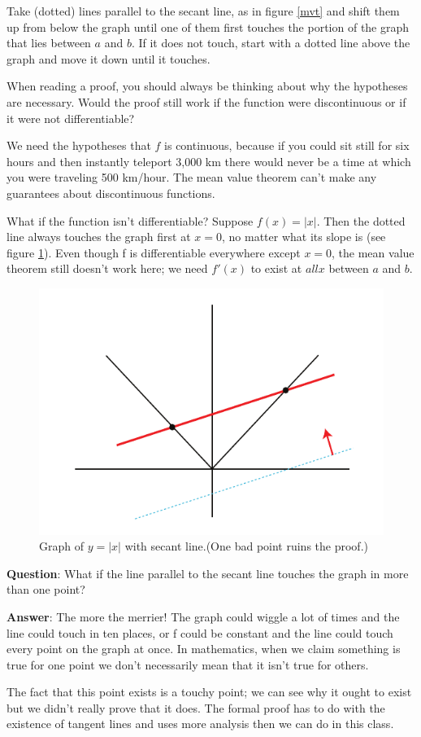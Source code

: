 \documentclass[a4paper,12pt]{article}
\begin{document}
Take (dotted) lines parallel to the secant line, as in figure \ref{mvt} and shift them up from below the graph until one of them first touches the portion of the graph that lies between $a$ and $b$. If it does not touch, start with a dotted line above the graph and move it down until it touches.

When reading a proof, you should always be thinking about why the hypotheses are necessary. Would the proof still work if the function were discontinuous or if it were not differentiable?

We need the hypotheses that $f$ is continuous, because if you could sit still for six hours and then instantly teleport 3,000 km there would never be a time at which you were traveling 500 km/hour. The mean value theorem can't make any guarantees about discontinuous functions.

What if the function isn't differentiable? Suppose $f(x)=|x|$. Then the
dotted line always touches the graph first at $x=0$, no matter what its slope is (see figure \ref{ruinmvt}). Even though f is differentiable everywhere except $x=0$, the mean value theorem still doesn't work here; we need $f'(x)$ to exist at $all x$ between $a$ and $b$.


\begin{figure}[ht]
\centering
\includegraphics{fig2.png}
\caption{Graph of $y=|x|$ with secant line.(One bad point ruins the proof.)}
\label{ruinmvt}
\end{figure}

\textbf{Question}: What if the line parallel to the secant line touches the graph in more than one point?

\textbf{Answer}: The more the merrier! The graph could wiggle a lot of times and the line could touch in ten places, or f could be constant and the line could touch every point on the graph at once. In mathematics, when we claim something is true for one point we don't necessarily mean that it isn't true for others.

The fact that this point exists is a touchy point; we can see why it ought to exist but we didn't really prove that it does. The formal proof has to do with the existence of tangent lines and uses more analysis then we can do in this class.
\end{document}
